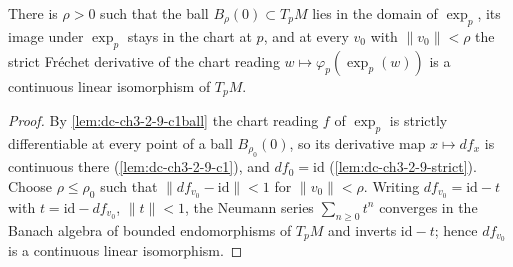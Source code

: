 \begin{lemma}
  \label{lem:dc-ch3-2-9-invertible}
  \leanok
  There is $\rho > 0$ such that the ball $B_\rho(0) \subset T_pM$ lies in the
  domain of $\exp_p$, its image under $\exp_p$ stays in the chart at $p$, and
  at every $v_0$ with $\|v_0\| < \rho$ the strict Fr\'echet derivative of the
  chart reading $w \mapsto \varphi_p(\exp_p(w))$ is a continuous linear
  isomorphism of $T_pM$.
\end{lemma}
\begin{proof}
  \sketch
  \leanok
  By \cref{lem:dc-ch3-2-9-c1ball} the chart reading $f$ of $\exp_p$ is strictly
  differentiable at every point of a ball $B_{\rho_0}(0)$, so its derivative
  map $x \mapsto df_x$ is continuous there (\cref{lem:dc-ch3-2-9-c1}), and
  $df_0 = \mathrm{id}$ (\cref{lem:dc-ch3-2-9-strict}). Choose
  $\rho \le \rho_0$ such that $\|df_{v_0} - \mathrm{id}\| < 1$ for
  $\|v_0\| < \rho$. Writing $df_{v_0} = \mathrm{id} - t$ with
  $t = \mathrm{id} - df_{v_0}$, $\|t\| < 1$, the Neumann series
  $\sum_{n \ge 0} t^n$ converges in the Banach algebra of bounded endomorphisms
  of $T_pM$ and inverts $\mathrm{id} - t$; hence $df_{v_0}$ is a continuous
  linear isomorphism.
\end{proof}

